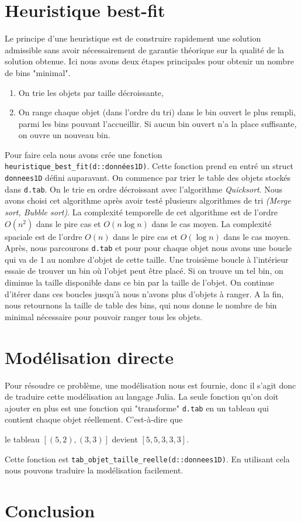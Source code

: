\documentclass{article}
\begin{document}
\section{Heuristique best-fit}
    Le principe d’une heuristique est de construire rapidement une solution admissible sans avoir nécessairement de garantie théorique sur la qualité de la solution obtenue. Ici nous avons deux étapes principales pour obtenir un nombre de bins "minimal".
    \begin{enumerate}
        \item On trie les objets par taille décroissante,
        \item On range chaque objet (dans l’ordre du tri) dans le bin ouvert le plus rempli, parmi les bins pouvant l’accueillir. Si aucun bin ouvert n’a la place suffisante, on ouvre un nouveau bin.
    \end{enumerate}
    Pour faire cela nous avons crée une fonction \texttt{heuristique\_best\_fit(d::données1D)}.
    Cette fonction prend en entré un struct \texttt{donnees1D} défini auparavant. \newline
    On commence par trier le table des objets stockés dans \texttt{d.tab}. On le trie en ordre décroissant avec l'algorithme \textit{Quicksort}. Nous avons choisi cet algorithme après avoir testé plusieurs algorithmes de tri \textit{(Merge sort, Bubble sort)}. La complexité temporelle de cet algorithme est de l'ordre $O(n^2)$ dans le pire cas et $O(n\log n)$ dans le cas moyen. La complexité spaciale est de l'ordre $O(n)$ dans le pire cas et $O(\log n)$ dans le cas moyen. \newline
    Après, nous parcourons \texttt{d.tab} et pour pour chaque objet nous avons une boucle qui va de 1 au nombre d'objet de cette taille. Une troisième boucle à l'intérieur essaie de trouver un bin où l'objet peut être placé. Si on trouve un tel bin, on diminue la taille disponible dans ce bin par la taille de l'objet. On continue d'itérer dans ces boucles jusqu'à nous n'avons plus d'objets à ranger. A la fin, nous retournons la taille de table des bins, qui nous donne le nombre de bin minimal nécessaire pour pouvoir ranger tous les objets.


\section{Modélisation directe}
    Pour résoudre ce problème, une modélisation nous est fournie, donc il s'agit donc de traduire cette modélisation au langage Julia. La seule fonction qu'on doit ajouter en plus est une fonction qui "transforme" \texttt{d.tab} en un tableau qui contient chaque objet réellement. C'est-à-dire que
    \begin{center}
        le tableau $[(5,2), (3,3)]$ devient $[5,5,3,3,3]$.
    \end{center}
    Cette fonction est \texttt{tab\_objet\_taille\_reelle(d::donnees1D)}. 
    En utilisant cela nous pouvons traduire la modélisation facilement.


\section{Conclusion}
\end{document}
